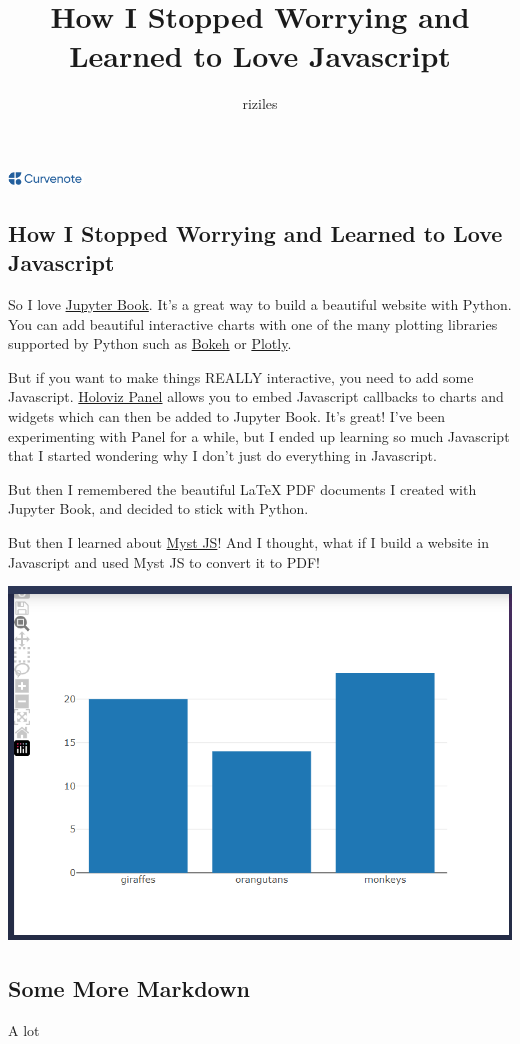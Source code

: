 \documentclass{article}
\title{How I Stopped Worrying and Learned to Love Javascript}
\author{riziles}
\date{\displaydate{articleDate}}
\newcommand{\logo}{
  \href{https://curvenote.com}{\includegraphics[width=2cm]{curvenote.png}}
}
\begin{document}
\maketitle
\begin{center}\logo\end{center}


\subsection*{How I Stopped Worrying and Learned to Love Javascript}

So I love \href{https://jupyterbook.org/en/stable/start/your-first-book.html}{Jupyter Book}.
It's a great way to build a beautiful website with Python.
You can add beautiful interactive charts with one of the many plotting libraries supported by Python
such as \href{https://bokeh.org/}{Bokeh} or \href{https://plotly.com/python/}{Plotly}.

But if you want to make things REALLY interactive, you need to add some Javascript.
\href{https://panel.holoviz.org/user_guide/Links.html#defining-javascript-callbacks}{Holoviz Panel}
allows you to embed Javascript callbacks to charts and widgets which
can then be added to Jupyter Book. It's great! I've been experimenting with Panel for a while,
but I ended up learning so much Javascript that I started wondering why I don't just do everything in Javascript.

But then I remembered the beautiful LaTeX PDF documents I created with Jupyter Book,
and decided to stick with Python.

But then I learned about \href{https://myst-tools.org/docs/mystjs}{Myst JS}! And I thought,
what if I build a website in Javascript and used Myst JS to convert it to PDF!

\includegraphics[width=0.7\linewidth]{images/Capture-037f1a6709c029d6e4166b657d95e6ef.PNG}

\subsection*{Some More Markdown}

A lot



\end{document}
